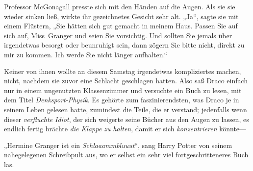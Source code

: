 Professor McGonagall presste sich mit den Händen auf die Augen. Als sie sie wieder sinken ließ, wirkte ihr gezeichnetes Gesicht sehr alt. „Ja“, sagte sie mit einem Flüstern, „Sie hätten sich gut gemacht in meinem Haus. Passen Sie auf sich auf, Miss~Granger und seien Sie vorsichtig. Und sollten Sie jemals über irgendetwas besorgt oder beunruhigt sein, dann zögern Sie bitte nicht, direkt zu mir zu kommen. Ich werde Sie nicht länger aufhalten.“


Keiner von ihnen wollte an diesem Samstag irgendetwas kompliziertes machen, nicht, nachdem sie zuvor eine Schlacht geschlagen hatten. Also saß Draco einfach nur in einem ungenutzten Klassenzimmer und versuchte ein Buch zu lesen, mit dem Titel \emph{Denksport-Physik}.%
Es gehörte zum faszinierendsten, was Draco je in seinem Leben gelesen hatte, zumindest die Teile, die er verstand; jedenfalls wenn dieser \emph{verfluchte Idiot}, der sich weigerte seine Bücher aus den Augen zu lassen, es endlich fertig brächte \emph{die Klappe zu halten}, damit er sich \emph{konzentrieren} könnte—

„Hermine Granger ist ein \emph{Schlaaammbluuut}“, sang Harry Potter von seinem nahegelegenen Schreibpult aus, wo er selbst ein sehr viel fortgeschritteneres Buch las.

